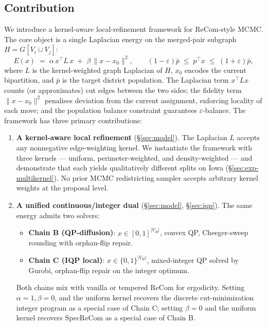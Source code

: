 \documentclass[11pt]{article}
\begin{document}
\subsection{Contribution}\label{sec:intro-contribution}

We introduce a kernel-aware local-refinement framework for ReCom-style
MCMC. The core object is a single Laplacian energy on the merged-pair
subgraph $H = G[V_i \cup V_j]$:
\begin{equation}\label{eq:core-energy}
  E(x) \;=\; \alpha\, x^\top L\, x \;+\; \beta\, \|x - x_0\|^2,
  \qquad
  (1 - \varepsilon)\bar p \;\le\; p^\top x \;\le\; (1+\varepsilon)\bar p,
\end{equation}
where $L$ is the kernel-weighted graph Laplacian of $H$, $x_0$ encodes
the current bipartition, and $\bar p$ is the target district
population. The Laplacian term $x^\top L x$ counts (or approximates)
cut edges between the two sides; the fidelity term $\|x - x_0\|^2$
penalises deviation from the current assignment, enforcing locality of
each move; and the population balance constraint guarantees
$\varepsilon$-balance. The framework has three primary contributions:

\begin{enumerate}
  \item \textbf{A kernel-aware local refinement} (\S\ref{sec:model}).
    The Laplacian $L$ accepts any nonnegative edge-weighting kernel.
    We instantiate the framework with three kernels --- uniform,
    perimeter-weighted, and density-weighted --- and demonstrate that
    each yields qualitatively different splits on Iowa
    (\S\ref{sec:exp-multikernel}). No prior MCMC redistricting sampler
    accepts arbitrary kernel weights at the proposal level.

  \item \textbf{A unified continuous/integer dual} (\S\ref{sec:model},
    \S\ref{sec:iqp}). The same energy admits two solvers:
    \begin{itemize}
      \item \textbf{Chain B (QP-diffusion)}: $x \in [0,1]^{|V_H|}$,
        convex QP, Cheeger-sweep rounding with orphan-flip repair.
      \item \textbf{Chain C (IQP local)}: $x \in \{0,1\}^{|V_H|}$,
        mixed-integer QP solved by Gurobi, orphan-flip repair on the
        integer optimum.
    \end{itemize}
    Both chains mix with vanilla or tempered ReCom for ergodicity.
    Setting $\alpha = 1, \beta = 0$, and the uniform kernel recovers
    the discrete cut-minimization integer program as a special case of
    Chain C; setting $\beta = 0$ and the uniform kernel recovers
    SpecReCom \cite{davies2025spectral} as a special case of Chain B.

\end{enumerate}
\end{document}
